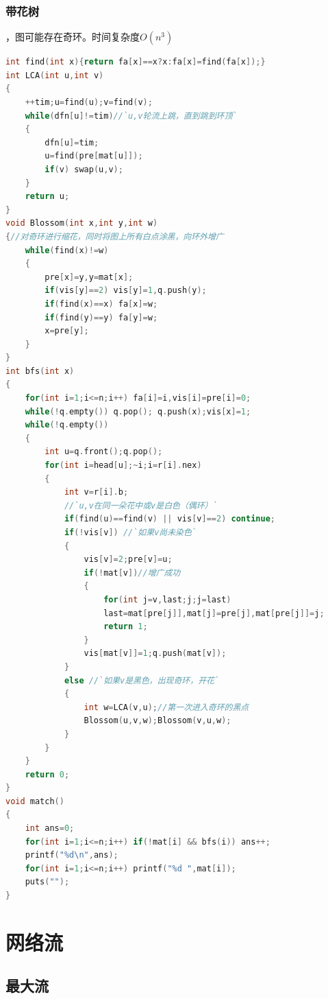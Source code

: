 \documentclass[a4paper]{book}
\begin{document}
\subsubsection{带花树}
，图可能存在奇环。时间复杂度$O(n^3)$\\
\begin{lstlisting}[language=c++,escapeinside=``]
int find(int x){return fa[x]==x?x:fa[x]=find(fa[x]);}
int LCA(int u,int v)
{
    ++tim;u=find(u);v=find(v);
    while(dfn[u]!=tim)//`u,v轮流上跳，直到跳到环顶`
    {
        dfn[u]=tim;
        u=find(pre[mat[u]]);
        if(v) swap(u,v);
    }
    return u;
}
void Blossom(int x,int y,int w)
{//对奇环进行缩花，同时将图上所有白点涂黑，向环外增广
    while(find(x)!=w)
    {
        pre[x]=y,y=mat[x];
        if(vis[y]==2) vis[y]=1,q.push(y);
        if(find(x)==x) fa[x]=w;
        if(find(y)==y) fa[y]=w;
        x=pre[y];
    }
}
int bfs(int x)
{
    for(int i=1;i<=n;i++) fa[i]=i,vis[i]=pre[i]=0;
    while(!q.empty()) q.pop(); q.push(x);vis[x]=1;
    while(!q.empty())
    {
        int u=q.front();q.pop();
        for(int i=head[u];~i;i=r[i].nex)
        {
            int v=r[i].b;
            //`u,v在同一朵花中或v是白色（偶环）`
            if(find(u)==find(v) || vis[v]==2) continue;
            if(!vis[v]) //`如果v尚未染色`
            {
                vis[v]=2;pre[v]=u;
                if(!mat[v])//增广成功
                {
                    for(int j=v,last;j;j=last) 
                    last=mat[pre[j]],mat[j]=pre[j],mat[pre[j]]=j;
                    return 1;
                }
                vis[mat[v]]=1;q.push(mat[v]);
            }
            else //`如果v是黑色，出现奇环，开花`
            {
                int w=LCA(v,u);//第一次进入奇环的黑点
                Blossom(u,v,w);Blossom(v,u,w);
            }
        }
    }
    return 0;
}
void match()
{
    int ans=0;
    for(int i=1;i<=n;i++) if(!mat[i] && bfs(i)) ans++;
    printf("%d\n",ans);
    for(int i=1;i<=n;i++) printf("%d ",mat[i]);
    puts("");
}
\end{lstlisting}
\section{网络流}
\subsection{最大流}
\end{document}
